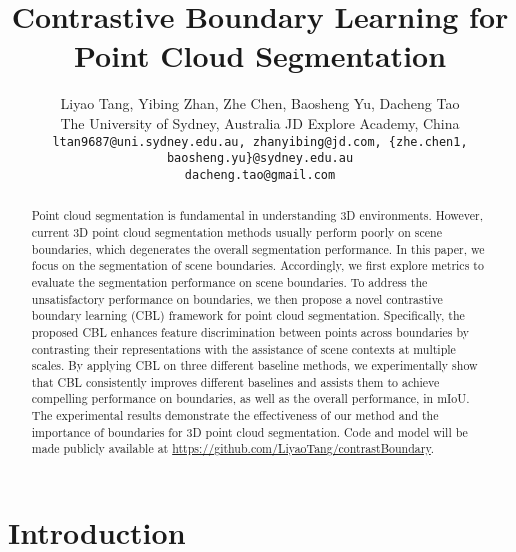 \documentclass[10pt,twocolumn,letterpaper]{article}
\begin{document}
\title{Contrastive Boundary Learning for Point Cloud Segmentation}

\author{
Liyao Tang, Yibing Zhan, Zhe Chen, Baosheng Yu, Dacheng Tao \\
 The University of Sydney, Australia  JD Explore Academy, China \\
{\tt\small ltan9687@uni.sydney.edu.au, zhanyibing@jd.com, \{zhe.chen1, baosheng.yu\}@sydney.edu.au} \\
{\tt\small dacheng.tao@gmail.com}
}

\maketitle



\begin{abstract}
Point cloud segmentation is fundamental in understanding 3D environments. However, current 3D point cloud segmentation methods usually perform poorly on scene boundaries, which degenerates the overall segmentation performance. In this paper, we focus on the segmentation of scene boundaries. Accordingly, we first explore metrics to evaluate the segmentation performance on scene boundaries. To address the unsatisfactory performance on boundaries, we then propose a novel contrastive boundary learning (CBL) framework for point cloud segmentation. Specifically, the proposed CBL enhances feature discrimination between points across boundaries by contrasting their representations with the assistance of scene contexts at multiple scales.
By applying CBL on three different baseline methods, we experimentally show that CBL consistently improves different baselines and assists them to achieve compelling performance on boundaries, as well as the overall performance, \eg in mIoU.
The experimental results demonstrate the effectiveness of our method and the importance of boundaries for 3D point cloud segmentation.
Code and model will be made publicly available at \href{https://github.com/LiyaoTang/contrastBoundary}{https://github.com/LiyaoTang/contrastBoundary}.
\end{abstract}



\section{Introduction}
\label{sec:intro}
\end{document}
